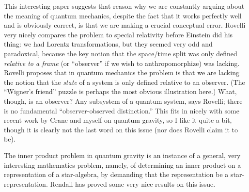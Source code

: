 \documentclass[12pt]{article}
\def\tightlist{}
\renewcommand{\texttt}[1]{%
  \begingroup
  \ttfamily
  \begingroup\lccode`~=`/\lowercase{\endgroup\def~}{/\discretionary{}{}{}}%
  \begingroup\lccode`~=`[\lowercase{\endgroup\def~}{[\discretionary{}{}{}}%
  \begingroup\lccode`~=`.\lowercase{\endgroup\def~}{.\discretionary{}{}{}}%
  \catcode`/=\active\catcode`[=\active\catcode`.=\active
  \scantokens{#1\noexpand}%
  \endgroup
}
\begin{document}
\noindent
This interesting paper suggests that reason why we are constantly
arguing about the meaning of quantum mechanics, despite the fact that it
works perfectly well and is obviously correct, is that we are making a
crucial conceptual error. Rovelli very nicely compares the problem to
special relativity before Einstein did his thing: we had Lorentz
transformations, but they seemed very odd and paradoxical, because the
key notion that the space/time split was only defined \emph{relative to
a frame} (or ``observer'' if we wish to anthropomorphize) was lacking.
Rovelli proposes that in quantum mechanics the problem is that we are
lacking the notion that the \emph{state} of a system is only defined
relative to an observer. (The ``Wigner's friend'' puzzle is perhaps the
most obvious illustration here.) What, though, is an observer? Any
subsystem of a quantum system, says Rovelli; there is no fundamental
``observer-observed distinction.'' This fits in nicely with some recent
work by Crane and myself on quantum gravity, so I like it quite a bit,
though it is clearly not the last word on this issue (nor does Rovelli
claim it to be).

\noindent
The inner product problem in quantum gravity is an instance of a
general, very interesting mathematics problem, namely, of determining an
inner product on a representation of a star-algebra, by demanding that
the representation be a star-representation. Rendall has proved some
very nice results on this issue.

\end{document}
